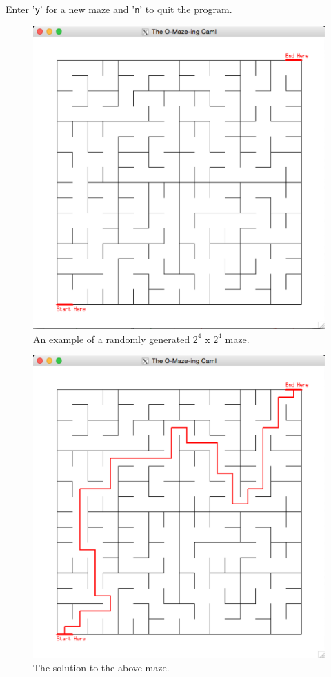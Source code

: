 \documentclass[11pt, margin=1in]{article}
\begin{document}
Enter '\texttt{y}' for a new maze and  '\texttt{n}' to quit the program.

\newpage
\begin{figure}[H]
\begin{center}
\includegraphics[scale=0.3]{example.jpg}
\caption{An example of a randomly generated $2^4$ x $2^4$ maze.}
\end{center}
\end{figure}


\begin{figure}[H]
\begin{center}
\includegraphics[scale=0.3]{solution.jpg}
\caption{The solution to the above maze.}
\end{center}
\end{figure}
\end{document}

